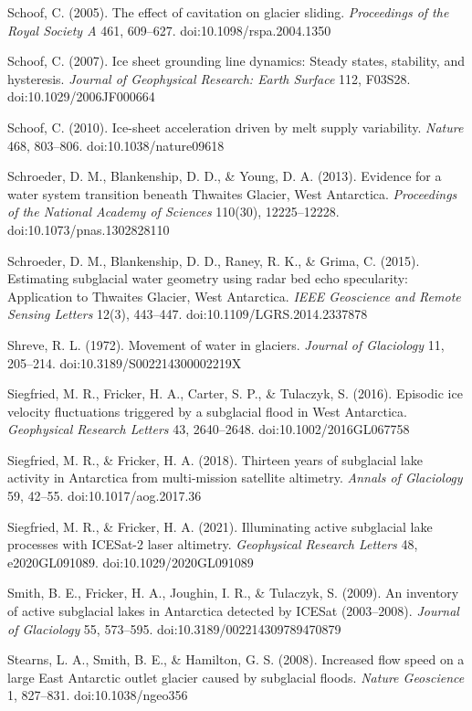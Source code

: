 \documentclass[11pt]{article}
\begin{document}
Schoof, C. (2005). The effect of cavitation on glacier sliding. \emph{Proceedings of the Royal Society A} 461, 609–627. doi:10.1098/rspa.2004.1350


Schoof, C. (2007). Ice sheet grounding line dynamics: Steady states, stability, and hysteresis. \emph{Journal of Geophysical Research: Earth Surface} 112, F03S28. doi:10.1029/2006JF000664


Schoof, C. (2010). Ice-sheet acceleration driven by melt supply variability. \emph{Nature} 468, 803–806. doi:10.1038/nature09618


Schroeder, D. M., Blankenship, D. D., \& Young, D. A. (2013). Evidence for a water system transition beneath Thwaites Glacier, West Antarctica. \emph{Proceedings of the National Academy of Sciences} 110(30), 12225–12228. doi:10.1073/pnas.1302828110


Schroeder, D. M., Blankenship, D. D., Raney, R. K., \& Grima, C. (2015). Estimating subglacial water geometry using radar bed echo specularity: Application to Thwaites Glacier, West Antarctica. \emph{IEEE Geoscience and Remote Sensing Letters} 12(3), 443–447. doi:10.1109/LGRS.2014.2337878


Shreve, R. L. (1972). Movement of water in glaciers. \emph{Journal of Glaciology} 11, 205–214. doi:10.3189/S002214300002219X


Siegfried, M. R., Fricker, H. A., Carter, S. P., \& Tulaczyk, S. (2016). Episodic ice velocity fluctuations triggered by a subglacial flood in West Antarctica. \emph{Geophysical Research Letters} 43, 2640–2648. doi:10.1002/2016GL067758


Siegfried, M. R., \& Fricker, H. A. (2018). Thirteen years of subglacial lake activity in Antarctica from multi-mission satellite altimetry. \emph{Annals of Glaciology} 59, 42–55. doi:10.1017/aog.2017.36


Siegfried, M. R., \& Fricker, H. A. (2021). Illuminating active subglacial lake processes with ICESat-2 laser altimetry. \emph{Geophysical Research Letters} 48, e2020GL091089. doi:10.1029/2020GL091089


Smith, B. E., Fricker, H. A., Joughin, I. R., \& Tulaczyk, S. (2009). An inventory of active subglacial lakes in Antarctica detected by ICESat (2003–2008). \emph{Journal of Glaciology} 55, 573–595. doi:10.3189/002214309789470879


Stearns, L. A., Smith, B. E., \& Hamilton, G. S. (2008). Increased flow speed on a large East Antarctic outlet glacier caused by subglacial floods. \emph{Nature Geoscience} 1, 827–831. doi:10.1038/ngeo356
\end{document}

